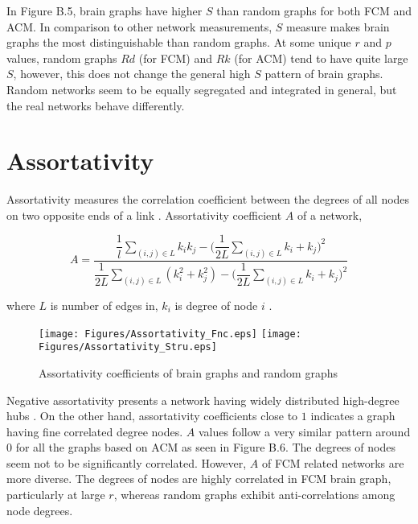 In Figure B.5, brain graphs have higher $S$ than random graphs for both FCM and ACM. In comparison to other network measurements, $S$ measure makes brain graphs the most distinguishable than random graphs. At some unique $r$ and $p$ values, random graphs $Rd$ (for FCM) and $Rk$ (for ACM) tend to have quite large $S$, however, this does not change the general high $S$ pattern of brain graphs. Random networks seem to be equally segregated and integrated in general, but the real networks behave differently. 



\section{Assortativity}

Assortativity measures the correlation coefficient between the degrees of all nodes on two opposite ends of a link \citep{RUB10}. Assortativity coefficient $A$ of a network, 

\begin{equation}
A = \frac{\dfrac{1}{l} \sum\limits_{(i,j) \in L}  k_i k_j -  \Big ( \dfrac{1}{2L} \sum\limits_{(i,j) \in L}k_i + k_j  \Big )^2}{\dfrac{1}{2L}\sum\limits_{(i,j) \in L} ( k_i^2+  k_j^2) -\Big ( \dfrac{1}{2L} \sum\limits_{(i,j) \in L}k_i + k_j  \Big )^2 }
\end{equation}

where $L$ is number of edges in, $k_i$ is degree of node $i$ \citep{NEW02a}.


\begin{figure}[htbp]
 
  \centering
	 \texttt{[image: Figures/Assortativity\_Fnc.eps]}
	 \texttt{[image: Figures/Assortativity\_Stru.eps]}
  \caption[Assortativity]{Assortativity coefficients of brain graphs and random graphs} 
    \label{fig:Assortativity}
 	
\end{figure}

Negative assortativity presents a network having widely distributed high-degree hubs \citep{RUB10}. On the other hand, assortativity coefficients close to $1$ indicates a graph having fine correlated degree nodes. $A$ values follow a very similar pattern around 0 for all the graphs based on ACM as seen in Figure B.6. The degrees of nodes seem not to be significantly correlated. However, $A$ of FCM related networks are more diverse. The degrees of nodes are highly correlated in FCM brain graph, particularly at large $r$, whereas random graphs exhibit anti-correlations among node degrees.   

